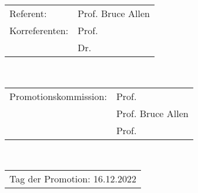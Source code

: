 \thispagestyle{empty}
\vspace*{\fill}
\begin{flushleft}
\begin{tabular}{l l}
	Referent:      & Prof. Bruce Allen\\
	Korreferenten: & Prof. \\
	               & Dr. 
\end{tabular}\\
\vspace{1cm}
\begin{tabular}{l l}
	Promotionskommission: & Prof. \\
	                      & Prof. Bruce Allen\\
	                      & Prof. 
\end{tabular}\\
\vspace{1cm}
\begin{tabular}{l}
Tag der Promotion: 16.12.2022
\end{tabular}
\end{flushleft}
\newpage
